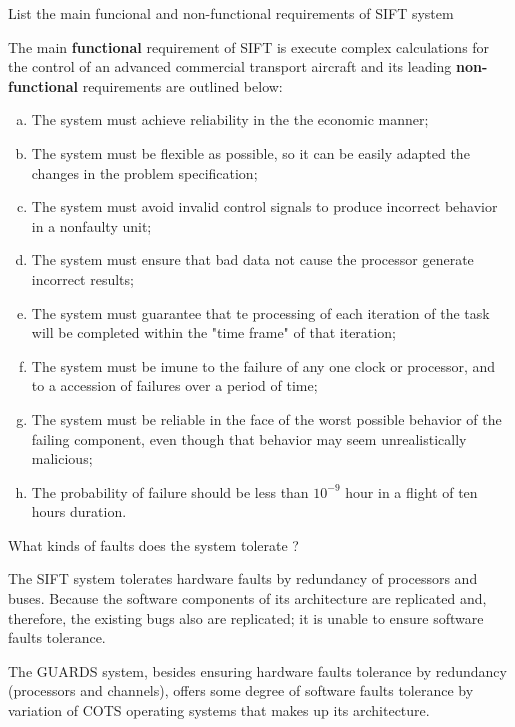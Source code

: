 \documentclass[12pt]{exam}
\begin{document}
  \begin{questions}
    \question List the main funcional and non-functional requirements of SIFT system  
    \begin{solution}
        
        The main \textbf{functional} requirement of SIFT is execute complex calculations for the control of an advanced commercial transport 
        aircraft and its leading \textbf{non-functional }requirements are outlined below:
        
        \begin{enumerate}[(a)]
          \item The system must achieve reliability in the the economic manner;
          \item The system must be flexible as possible, so it can be easily adapted the changes in the problem specification;
          \item The system must avoid invalid control signals to produce incorrect behavior in a nonfaulty unit; 
          \item The system must ensure that bad data not cause the processor generate incorrect results;
          \item The system must guarantee that te processing  of each iteration of the task will be completed within the "time frame" of that iteration;
          \item The system must be imune to the failure of any one clock or processor, and to a accession of failures over a period of time;  
          \item The system must be reliable in the face of the worst possible behavior of the failing component, even though that behavior may seem unrealistically malicious;
          \item The probability of failure should be less than $10^{-9}$ hour in a flight of ten hours duration.
        \end{enumerate}
    \end{solution}

    \question What kinds of faults does the system tolerate ?
    \begin{solution}
      
    The SIFT system tolerates hardware faults by redundancy of processors and buses. Because the software components of its architecture are replicated and, therefore, the existing bugs also are replicated; it is unable to ensure software faults tolerance. 
      
    The GUARDS system, besides ensuring hardware faults tolerance by redundancy (processors and channels), offers some degree of software faults tolerance by variation of COTS operating systems that makes up its architecture.
    

\end{solution}
\end{questions}
\end{document}
